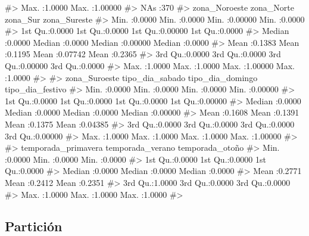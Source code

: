 \documentclass[
  spanish,
  letterpaper,
  DIV=11,
  numbers=noendperiod]{scrartcl}
\newenvironment{Shaded}{\begin{snugshade}}{\end{snugshade}}
\newcommand{\CommentTok}[1]{\textcolor[rgb]{0.37,0.37,0.37}{#1}}
\begin{document}
\begin{Shaded}
\begin{Highlighting}[]
\CommentTok{\#\textgreater{}                                     Max.   :1.0000   Max.   :1.00000  }
\CommentTok{\#\textgreater{}                                     NAs    :370                       }
\CommentTok{\#\textgreater{}  zona\_Noroeste      zona\_Norte        zona\_Sur        zona\_Sureste   }
\CommentTok{\#\textgreater{}  Min.   :0.0000   Min.   :0.0000   Min.   :0.00000   Min.   :0.0000  }
\CommentTok{\#\textgreater{}  1st Qu.:0.0000   1st Qu.:0.0000   1st Qu.:0.00000   1st Qu.:0.0000  }
\CommentTok{\#\textgreater{}  Median :0.0000   Median :0.0000   Median :0.00000   Median :0.0000  }
\CommentTok{\#\textgreater{}  Mean   :0.1383   Mean   :0.1195   Mean   :0.07742   Mean   :0.2365  }
\CommentTok{\#\textgreater{}  3rd Qu.:0.0000   3rd Qu.:0.0000   3rd Qu.:0.00000   3rd Qu.:0.0000  }
\CommentTok{\#\textgreater{}  Max.   :1.0000   Max.   :1.0000   Max.   :1.00000   Max.   :1.0000  }
\CommentTok{\#\textgreater{}                                                                      }
\CommentTok{\#\textgreater{}  zona\_Suroeste    tipo\_dia\_sabado  tipo\_dia\_domingo tipo\_dia\_festivo }
\CommentTok{\#\textgreater{}  Min.   :0.0000   Min.   :0.0000   Min.   :0.0000   Min.   :0.00000  }
\CommentTok{\#\textgreater{}  1st Qu.:0.0000   1st Qu.:0.0000   1st Qu.:0.0000   1st Qu.:0.00000  }
\CommentTok{\#\textgreater{}  Median :0.0000   Median :0.0000   Median :0.0000   Median :0.00000  }
\CommentTok{\#\textgreater{}  Mean   :0.1608   Mean   :0.1391   Mean   :0.1375   Mean   :0.04385  }
\CommentTok{\#\textgreater{}  3rd Qu.:0.0000   3rd Qu.:0.0000   3rd Qu.:0.0000   3rd Qu.:0.00000  }
\CommentTok{\#\textgreater{}  Max.   :1.0000   Max.   :1.0000   Max.   :1.0000   Max.   :1.00000  }
\CommentTok{\#\textgreater{}                                                                      }
\CommentTok{\#\textgreater{}  temporada\_primavera temporada\_verano temporada\_otoño }
\CommentTok{\#\textgreater{}  Min.   :0.0000      Min.   :0.0000   Min.   :0.0000  }
\CommentTok{\#\textgreater{}  1st Qu.:0.0000      1st Qu.:0.0000   1st Qu.:0.0000  }
\CommentTok{\#\textgreater{}  Median :0.0000      Median :0.0000   Median :0.0000  }
\CommentTok{\#\textgreater{}  Mean   :0.2771      Mean   :0.2412   Mean   :0.2351  }
\CommentTok{\#\textgreater{}  3rd Qu.:1.0000      3rd Qu.:0.0000   3rd Qu.:0.0000  }
\CommentTok{\#\textgreater{}  Max.   :1.0000      Max.   :1.0000   Max.   :1.0000  }
\CommentTok{\#\textgreater{} }
\end{Highlighting}
\end{Shaded}

\subsection{Partición}\label{particiuxf3n}
\end{document}
